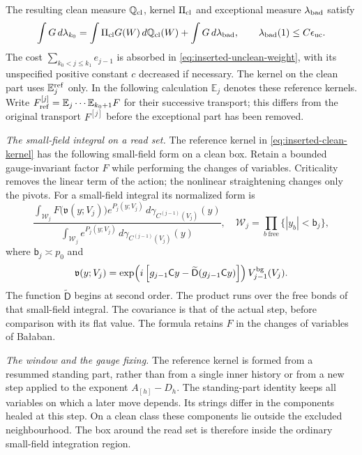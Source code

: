 \documentclass[11pt,letterpaper,reqno]{amsart}
\theoremstyle{definition}
\theoremstyle{remark}
\begin{document}
The resulting clean measure $\mathbb Q_{\rm cl}$, kernel
$\Pi_{\rm cl}$ and exceptional measure $\lambda_{\rm bad}$ satisfy
\begin{equation}\label{eq:inserted-clean-sum}
 \int G\,d\lambda_{k_0}
 =\int\Pi_{\rm cl}G(W)\,d\mathbb Q_{\rm cl}(W)
                  +\int G\,d\lambda_{\rm bad},\qquad
 \lambda_{\rm bad}(1)\le C\epsilon_{\rm uc}.
\end{equation}
The cost $\sum_{k_0<j\le k_1}e_{j-1}$ is absorbed in
\eqref{eq:inserted-unclean-weight}, with its unspecified positive
constant $c$ decreased if necessary. The kernel on the clean part
uses $\mathbb E_j^{\rm ref}$ only. In the following calculation
$\mathbb E_j$ denotes these reference kernels. Write
$F_{\rm ref}^{[j]}=\mathbb E_j\cdots\mathbb E_{k_0+1}F$ for their
successive transport; this differs from the original transport
$F^{[j]}$ before the exceptional part has been removed.

\emph{The small-field integral on a read set.}
The reference kernel in \eqref{eq:inserted-clean-kernel} has the
following small-field form on a clean box. Retain a bounded gauge-invariant
factor $F$ while performing the changes of variables. Criticality
removes the linear term of the action; the nonlinear straightening
changes only the pivots. For a small-field integral its normalized
form is
\begin{equation}\label{eq:inserted-small-field-law}
 \frac{\displaystyle\int_{\mathcal W_j}
 F\big(\mathfrak v(y;V_j)\big)e^{P_j(y;V_j)}
                         \,d\gamma_{C^{(j-1)}(V_j)}(y)}
 {\displaystyle\int_{\mathcal W_j}
 e^{P_j(y;V_j)}\,d\gamma_{C^{(j-1)}(V_j)}(y)},
 \quad
 \mathcal W_j=\prod_{b\ {\mathrm{free}}}\{|y_b|<\mathsf b_j\},
\end{equation}
where $\mathsf b_j\asymp p_0$ and
\[
 \mathfrak v(y;V_j)=
 \exp\!\left(i\left[g_{j-1}\mathsf Cy
                   -\widetilde{\mathsf D}(g_{j-1}\mathsf Cy)\right]\right)
                       V_{j-1}^{\rm bg}(V_j).
\]
The function $\widetilde{\mathsf D}$ begins at second order.
The product runs over the free bonds of that small-field integral.
The covariance is that of the actual step, before comparison with its
flat value. The formula retains $F$ in the changes of variables of
Ba\l aban\cite[Section~2, equations~(2.1)--(2.16)]{Balaban1987}.

\emph{The window and the gauge fixing.}
The reference kernel is formed from a resummed standing part,
rather than from a single inner history or from a new step applied
to the exponent $A_{[h]}-D_h$. The standing-part identity keeps all
variables on which a later move depends. Its strings differ in the
components healed at this step. On a clean class these components
lie outside the excluded neighbourhood. The box around the read
set is therefore inside the ordinary small-field integration
region.
\end{document}
